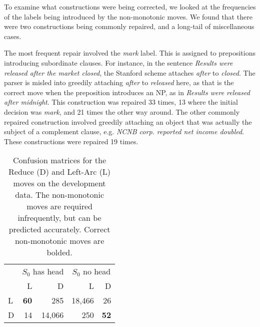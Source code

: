 \documentclass[11pt,letterpaper]{article}
\begin{document}
To examine what constructions were being corrected, we looked at the frequencies
of the labels being introduced by the non-monotonic moves. We found that there were
two constructions being commonly repaired, and a long-tail of miscellaneous cases.

The most frequent repair involved the \emph{mark} label. This is assigned to
prepositions introducing subordinate clauses. For instance, in the sentence
\emph{Results were released after the market closed}, the Stanford scheme
attaches \emph{after} to \emph{closed}. The parser is misled into greedily
attaching \emph{after} to \emph{released} here, as that is the correct move 
when the preposition introduces an NP, as in
\emph{Results were released after midnight}.
This construction was repaired 33 times, 13 where the initial decision was \emph{mark},
and 21 times the other way around. The other commonly repaired construction involved
greedily attaching an object that was actually the subject of a complement clause, e.g.
\emph{NCNB corp. reported net income doubled}. These constructions were repaired 19 times.


\begin{table}
    \centering
    \small
    \begin{tabular}{l|rr | rr}
\hline
& \multicolumn{2}{|c}{$S_0$ has head} & \multicolumn{2}{|c}{$S_0$ no head} \\
   & L  &  D     & L      & D \\
\hline \hline
L  & \textbf{60} & 285    & 18,466 & 26   \\
D  & 14 & 14,066 & 250    & \textbf{52} \\ 
\hline
\end{tabular}
\caption{\small
    Confusion matrices for the Reduce (D) and Left-Arc (L) moves on the development
    data. The non-monotonic moves are required infrequently, but can be predicted
    accurately. Correct non-monotonic moves are bolded.
\label{tab:confusions}}
\end{table}

\end{document}
